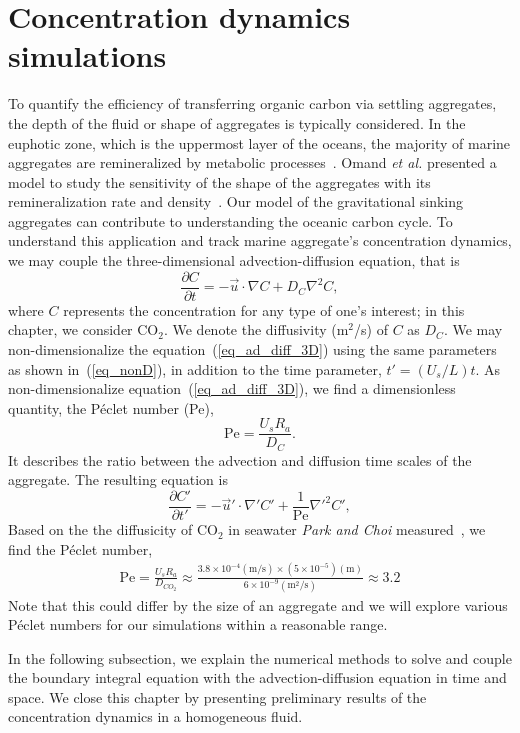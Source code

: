 \section{Concentration dynamics simulations}
\label{sec:concentration}
To quantify the efficiency of transferring organic carbon via settling aggregates, the depth of the fluid or shape of aggregates is typically considered.
In the euphotic zone, which is the uppermost layer of the oceans, the majority of marine aggregates are remineralized by metabolic processes~\cite{henson_global_2012}. Omand {\it{et al.}} presented a model to study the sensitivity of the shape of the aggregates with its remineralization rate and density~\cite{omand_sinking_2020}. 
Our model of the gravitational sinking aggregates can contribute to understanding the oceanic carbon cycle. 
To understand this application and track marine aggregate's concentration dynamics, we may couple the three-dimensional advection-diffusion equation, that is 
\begin{equation}
	\frac{\partial C }{\partial t} 
	= - \vec{u} \cdot \nabla C
	+ D_{C} \nabla^2 C,
	\label{eq_ad_diff_3D}
\end{equation} 
where $C$ represents the concentration for any type of one's interest; in this chapter, we consider CO$_2$. 
We denote the diffusivity (m$^2$/s) of $C$ as $D_{C}$.
We may non-dimensionalize the equation~(\ref{eq_ad_diff_3D}) using the same parameters as shown in~(\ref{eq_nonD}), in addition to the time parameter, $t' = \left(U_s/L \right) t$. 
As non-dimensionalize equation~(\ref{eq_ad_diff_3D}), 
 we find a dimensionless quantity, the Péclet number (Pe), 
 \begin{equation}
\text{Pe} = \frac{U_s R_a}{D_C}.	
\label{eq_def_Pe}
 \end{equation}
 It describes the ratio between the advection and diffusion time scales of the aggregate.  
 The resulting equation is
\begin{equation}
	\frac{\partial C' }{\partial t'} 
	= - \vec{u}' \cdot \nabla' C'
	+ \frac{1}{\text{Pe}} \nabla'^2 C',
	\label{eq_ad_diff_nonD}
\end{equation}
Based on the the diffusicity of CO$_2$ in seawater \textit{Park and Choi} measured~\cite{park_performance_2020}, we find the Péclet number,
\begin{align}
	\text{Pe} 
	= \frac{U_s R_a }{D_{CO_2}} 
	\approx \frac{3.8 \times 10^{-4}(\text{m/s}) \times \left(5 \times 10^{-5} \right) (\text{m})}{6 \times 10^{-9} (\text{m}^2\text{/s})} \approx 3.2
\end{align}
Note that this could differ by the size of an aggregate and we will explore various Péclet numbers for our simulations within a reasonable range. 
\par 
In the following subsection, we explain the numerical methods to solve and couple the boundary integral equation with the advection-diffusion equation in time and space. We close this chapter by presenting preliminary results of the concentration dynamics in a homogeneous fluid. 
